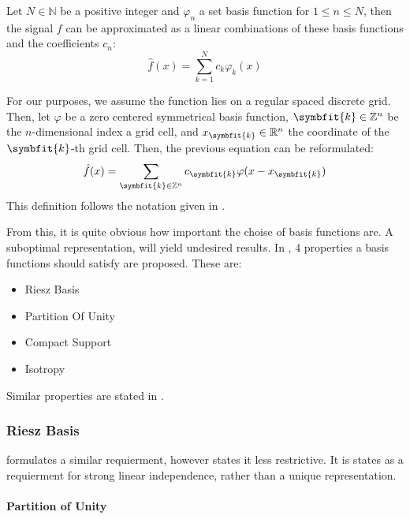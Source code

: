 \begin{definition}
    \label{def:permissible_representation}
    Let $N \in \mathbb{N}$ be a positive integer and $\varphi_n$ a set basis function for
    $1 \leq n \leq N$, then the signal $f$ can be approximated as a linear combinations
    of these basis functions and the coefficients $c_n$:
    \[ \hat{f}(x) = \sum_{k=1}^{N} c_k \varphi_k(x) \]

    For our purposes, we assume the function lies on a regular spaced discrete grid. Then, let
    $\varphi$ be a zero centered symmetrical basis function, $\symbfit{k} \in \mathbb{Z}^n$ be the
    $n$-dimensional index a grid cell, and $x_{\symbfit{k}} \in \mathbb{R}^n$ the coordinate of the
    $\symbfit{k}$-th grid cell. Then, the previous equation can be reformulated:
    \[ \hat{f}(x) = \sum_{\symbfit{k} \in \mathbb{Z}^n} c_{\symbfit{k}} \varphi(x - x_{\symbfit{k}}) \]
    This definition follows the notation given in \cite{momey_new_2011}.
\end{definition}

From this, it is quite obvious how important the choise of basis functions are. 
A suboptimal representation, will yield undesired results. In \cite{nilchian_optimized_2015}, 4 
properties a basis functions should satisfy are proposed. These are:
\begin{itemize}
    \item Riesz Basis
    \item Partition Of Unity
    \item Compact Support
    \item Isotropy
\end{itemize}

Similar properties are stated in \cite{hanson_local_1985}.

\subsubsection{Riesz Basis}


\cite{hanson_local_1985} formulates a similar requierment, however states it less restrictive. It is
states as a requierment for strong linear independence, rather than a unique representation.
 
\paragraph{Partition of Unity}
 

